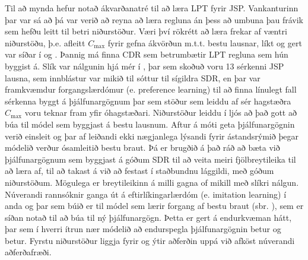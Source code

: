 \documentclass[10pt,a4paper]{article}
\begin{document}
Til að mynda hefur \cite{Siggi05} notað ákvarðanatré til að læra LPT fyrir JSP. 
Vankanturinn þar var sá að þá var verið að reyna að læra regluna án þess að 
umbuna þau frávik sem hefðu leitt til betri niðurstöður. 
Væri því rökrétt að læra frekar af væntri niðurstöðu, þ.e. afleitt $C_{\max}$ 
fyrir gefna ákvörðun m.t.t. bestu lausnar, líkt og gert var síðar í 
\cite{Malik08,Russell09} og \cite{Siggi10}. Þannig má finna CDR sem betrumbætir 
LPT regluna sem hún byggist á. Slík var nálgunin hjá mér í \cite{InRu15a}, þar 
sem skoðuð voru 13 sérkenni JSP lausna, sem innblástur var mikið til sóttur til 
sígildra SDR, en þar var framkvæmdur forgangslærdómur (e. preference learning) 
til að finna línulegt fall sérkenna byggt á þjálfunargögnum þar sem stöður sem 
leiddu af sér hagstæðra $C_{\max}$ voru teknar fram yfir óhagstæðari. 
Niðurstöður leiddu í ljós að það gott að búa til módel sem byggjast á bestu 
lausnum. Aftur á móti geta þjálfunargögnin verið einsleit og þar af leiðandi 
ekki nægjanlega lýsandi fyrir ástandsrýmið þegar módelið verður ósamleitið 
bestu braut. Þá er brugðið á það ráð að bæta við þjálfunargögnum sem byggjast á 
góðum SDR til að veita meiri fjölbreytileika til að læra af, til að takast á 
við að festast í staðbundnu lággildi, með góðum niðurstöðum. 
Mögulega er breytileikinn á milli gagna of mikill með slíkri nálgun. 
Núverandi rannsóknir ganga út á eftirlíkingarlærdóm (e. imitation learning) í 
anda \cite{RossB10} og \cite{RossGB11} þar sem búið er til módel sem lærir 
forgang af bestu braut (sbr. \cite{InRu11a,InRu15a}), sem er síðan notað til að 
búa til ný þjálfunargögn. 
Þetta er gert á endurkvæman hátt, þar sem í hverri ítrun nær módelið að 
endurspegla þjálfunargögnin betur og betur. 
Fyrstu niðurstöður liggja fyrir og ýtir aðferðin uppá við afköst núverandi 
aðferðafræði. 



  
\end{document}
